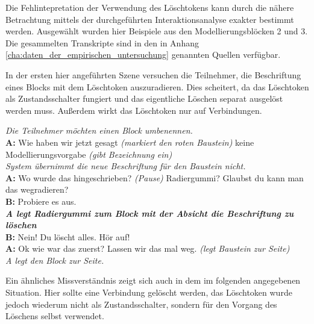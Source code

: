 Die Fehlintepretation der Verwendung des Löschtokens kann durch die nähere Betrachtung mittels der durchgeführten Interaktionsanalyse exakter bestimmt werden. Ausgewählt wurden hier Beispiele aus den Modellierungsblöcken 2 und 3. Die gesammelten Transkripte sind in den in Anhang \ref{cha:daten_der_empirischen_untersuchung} genannten Quellen verfügbar.

In der ersten hier angeführten Szene versuchen die Teilnehmer, die Beschriftung eines Blocks mit dem Löschtoken auszuradieren. Dies scheitert, da das Löschtoken als Zustandsschalter fungiert und das eigentliche Löschen separat ausgelöst werden muss. Außerdem wirkt das Löschtoken nur auf Verbindungen.

\begin{transkript}
	\emph{Die Teilnehmer möchten einen Block umbenennen.}\\
	\textbf{A:} Wie haben wir jetzt gesagt \emph{(markiert den roten Baustein)} keine Modellierungsvorgabe \emph{(gibt Bezeichnung ein)}\\
	\emph{System übernimmt die neue Beschriftung für den Baustein nicht.}\\
	\textbf{A:} Wo wurde das hingeschrieben? \emph{(Pause)} Radiergummi? Glaubst du kann man das wegradieren?\\
	\textbf{B:} Probiere es aus.\\
	\textbf{\emph{A legt Radiergummi zum Block mit der Absicht die Beschriftung zu löschen}}\\
	\textbf{B:} Nein! Du löscht alles. Hör auf! \\
	\textbf{A:} Ok wie war das zuerst? Lassen wir das mal weg. \emph{(legt Baustein zur Seite)}\\
	\emph{A legt den Block zur Seite.} 
\end{transkript}

Ein ähnliches Missverständnis zeigt sich auch in dem im folgenden angegebenen Situation. Hier sollte eine Verbindung gelöscht werden, das Löschtoken wurde jedoch wiederum nicht als Zustandsschalter, sondern für den Vorgang des Löschens selbst verwendet.

